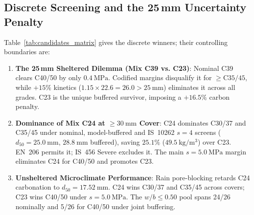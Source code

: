 \documentclass[journal]{IEEEtran}
\begin{document}
\subsection{\texorpdfstring{Discrete Screening and the 25\,mm Uncertainty Penalty}{Discrete Screening and the 25 mm Uncertainty Penalty}}
Table~\ref{tab:candidates_matrix} gives the discrete winners; their controlling boundaries are:
\begin{enumerate}\setlength{\itemsep}{0.5pt}\setlength{\parskip}{0pt}
    \item \textbf{The 25\,mm Sheltered Dilemma (Mix C39 vs. C23)}: Nominal C39 clears C40/50 by only $0.4\ \mathrm{MPa}$. Codified margins disqualify it for $\ge\mathrm{C35/45}$, while $+15\%$ kinetics ($1.15\times22.6=26.0>25\ \mathrm{mm}$) eliminates it across all grades. C23 is the unique buffered survivor, imposing a $+16.5\%$ carbon penalty.
    \item \textbf{Dominance of Mix C24 at $\ge 30\ \mathrm{mm}$ Cover}: C24 dominates C30/37 and C35/45 under nominal, model-buffered and IS~10262 $s=4$ screens ($d_{50}=25.0\ \mathrm{mm}$, $28.8\ \mathrm{mm}$ buffered), saving $25.1\%$ ($49.5\ \mathrm{kg/m^3}$) over C23. EN~206 permits it; IS~456 Severe excludes it. The main $s=5.0\ \mathrm{MPa}$ margin eliminates C24 for C40/50 and promotes C23.
    \item \textbf{Unsheltered Microclimate Performance}: Rain pore-blocking retards C24 carbonation to $d_{50}=17.52\ \mathrm{mm}$. C24 wins C30/37 and C35/45 across covers; C23 wins C40/50 under $s=5.0\ \mathrm{MPa}$. The $w/b\le0.50$ pool spans 24/26 nominally and 5/26 for C40/50 under joint buffering.
\end{enumerate}
\end{document}
